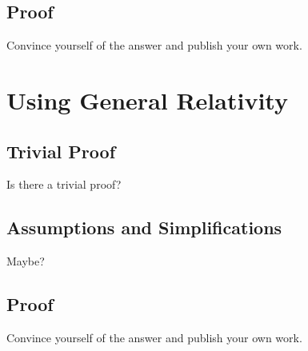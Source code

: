 \documentclass[]{report}
\begin{document}
      \subsection{Proof}
        Convince yourself of the answer and publish your own work.

    \section{Using General Relativity}

      \subsection{Trivial Proof}
        Is there a trivial proof?

      \subsection{Assumptions and Simplifications}
        Maybe?

      \subsection{Proof}
        Convince yourself of the answer and publish your own work.
\end{document}
